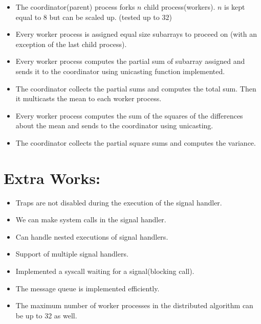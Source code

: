 \documentclass[a4 paper]{article}
\begin{document}
\begin{itemize}
  \item The coordinator(parent) process forks $n$ child process(workers). $n$ is kept equal to 8 but can be scaled up. (tested up to $32$)
  \item Every worker process is assigned equal size subarrays to proceed on (with an exception of the last child process).
  \item Every worker process computes the partial sum of subarray assigned and sends it to the coordinator using unicasting function implemented.
  \item The coordinator collects the partial sums and computes the total sum. Then it multicasts the mean to each worker process.
  \item Every worker process computes the sum of the squares of the differences about the mean and sends to the coordinator using unicasting.
  \item The coordinator collects the partial square sums and computes the variance.
\end{itemize}
  
\section{Extra Works:}
\begin{itemize}
  \item Traps are not disabled during the execution of the signal handler.
  \item We can make system calls in the signal handler.
  \item Can handle nested executions of signal handlers.
  \item Support of multiple signal handlers.
  \item Implemented a syscall waiting for a signal(blocking call).
  \item The message queue is implemented efficiently.
  \item The maximum number of worker processes in the distributed algorithm can be up to 32 as well.
\end{itemize}
\end{document}
